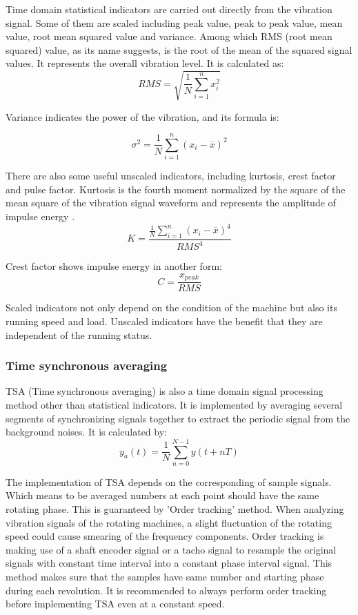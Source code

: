 Time domain statistical indicators are carried out directly from the vibration signal. Some of them are scaled including peak value, peak to peak value, mean value, root mean squared value and variance.
Among which RMS (root mean squared) value, as its name suggests, is the root of the mean of the squared signal values. It represents the overall vibration level. It is calculated as:
\begin{equation}
RMS = \sqrt{\frac{1}{N}\sum_{i=1}^n x_{i}^2}
\end{equation}

Variance indicates the power of the vibration, and its formula is:

\begin{equation}
\sigma^2 = \frac{1}{N}\sum_{i=1}^n (x_{i} - \overline{x})^2
\end{equation}

There are also some useful unscaled indicators, including kurtosis, crest factor and pulse factor. Kurtosis is the fourth moment normalized by the square of the mean square of the vibration signal waveform and represents the amplitude of impulse energy \cite{trending}.
\begin{equation}
K = \frac{\frac{1}{N}\sum_{i=1}^n (x_{i} - \overline{x})^4}{RMS^4}
\end{equation}

Crest factor shows impulse energy in another form:
\begin{equation}
C = \frac{x_{peak}}{RMS}
\end{equation}

Scaled indicators not only depend on the condition of the machine but also its running speed and load. Unscaled indicators have the benefit that they are independent of the running status.

\subsubsection{Time synchronous averaging}

TSA (Time synchronous averaging) is also a time domain signal processing method other than statistical indicators. It is implemented by averaging several segments of synchronizing signals together to extract the periodic signal from the background noises. It is calculated by:
\begin{equation}
y_{a}(t) = \frac{1}{N}\sum_{n=0}^{N-1} y(t+nT)
\end{equation}

The implementation of TSA depends on the corresponding of sample signals. Which means to be averaged numbers at each point should have the same rotating phase. This is guaranteed by 'Order tracking' method. When analyzing vibration signals of the rotating machines, a slight fluctuation of the rotating speed could cause smearing of the frequency components. Order tracking is making use of a shaft encoder signal or a tacho signal to resample the original signals with constant time interval into a constant phase interval signal. This method makes sure that the samples have same number and starting phase during each revolution. It is recommended to always perform order tracking before implementing TSA even at a constant speed.

